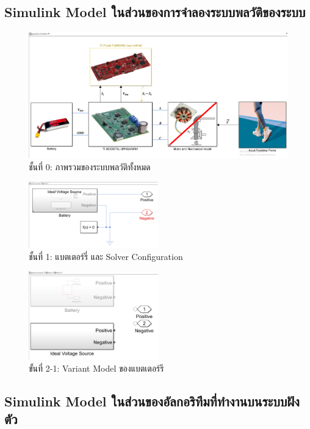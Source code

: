 \documentclass[11pt,a4paper]{article}
\begin{document}
\subsection{Simulink Model ในส่วนของการจำลองระบบพลวัติของระบบ}

\begin{figure}[h]
    \centering
    \includegraphics[width=\textwidth]{layer0.png}
    \caption{ชั้นที่ 0: ภาพรวมของระบบพลวัติทั้งหมด}
\end{figure}

\begin{figure}[h]
    \centering
    \includegraphics[width=0.5\textwidth]{layer1.png}
    \caption{ชั้นที่ 1: แบตเตอร์รี่ และ Solver Configuration}
\end{figure}

\begin{figure}[h]
    \centering
    \includegraphics[width=0.5\textwidth]{layer2-1.png}
    \caption{ขั้นที่ 2-1: Variant Model ของแบตเตอร์รี}
\end{figure}

\subsection{Simulink Model ในส่วนของอัลกอริทึมที่ทำงานบนระบบฝังตัว}
\end{document}
